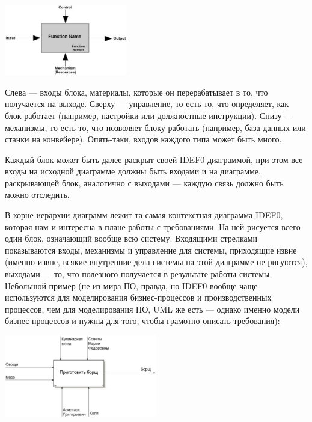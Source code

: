 \documentclass{../../text-style}
\begin{document}
\begin{center}
    \includegraphics[width=0.4\textwidth]{idef0block.png}
\end{center}

Слева --- входы блока, материалы, которые он перерабатывает в то, что получается на выходе. Сверху --- управление, то есть то, что определяет, как блок работает (например, настройки или должностные инструкции). Снизу --- механизмы, то есть то, что позволяет блоку работать (например, база данных или станки на конвейере). Опять-таки, входов каждого типа может быть много.

Каждый блок может быть далее раскрыт своей IDEF0-диаграммой, при этом все входы на исходной диаграмме должны быть входами и на диаграмме, раскрывающей блок, аналогично с выходами --- каждую связь должно быть можно отследить.

В корне иерархии диаграмм лежит та самая контекстная диаграмма IDEF0, которая нам и интересна в плане работы с требованиями. На ней рисуется всего один блок, означающий вообще всю систему. Входящими стрелками показываются входы, механизмы и управление для системы, приходящие извне (именно извне, всякие внутренние дела системы на этой диаграмме не рисуются), выходами --- то, что полезного получается в результате работы системы. Небольшой пример (не из мира ПО, правда, но IDEF0 вообще чаще используются для моделирования бизнес-процессов и производственных процессов, чем для моделирования ПО, UML же есть --- однако именно модели бизнес-процессов и нужны для того, чтобы грамотно описать требования):

\begin{center}
    \includegraphics[width=0.5\textwidth]{idef0Example.png}
\end{center}
\end{document}
